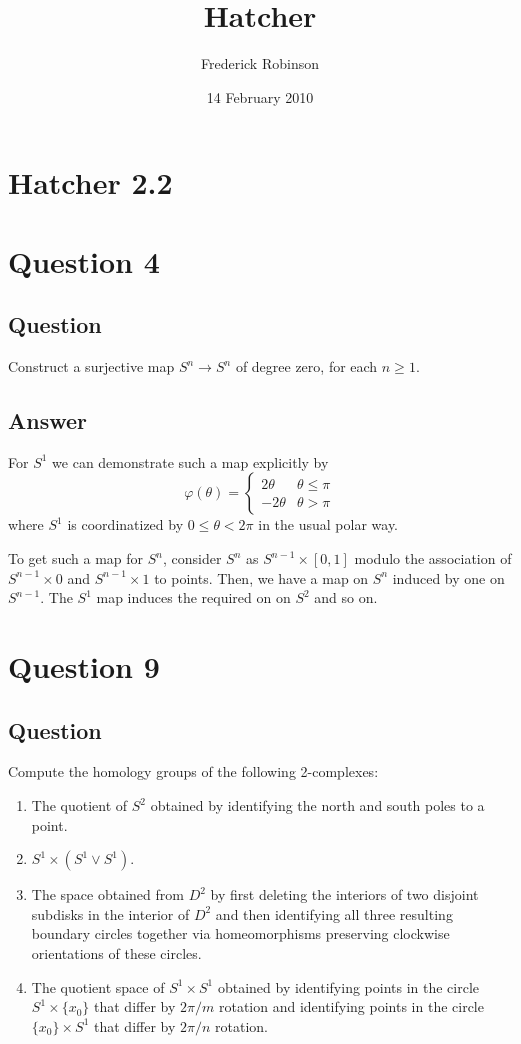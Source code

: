 \documentclass[11pt]{article}
\begin{document}



\title{Hatcher}
\author{Frederick Robinson}
\date{14 February 2010}
\maketitle


\section*{Hatcher 2.2}
\section{Question 4}
\subsection{Question}
Construct a surjective map $S^n \to S^n$ of degree zero, for each $n \geq 1$.
\subsection{Answer}
For $S^1$ we can demonstrate such a map explicitly by
\[\varphi(\theta) = \left\{ \begin{array}{ll} 2 \theta & \theta \leq \pi \\ -2 \theta & \theta > \pi \end{array} \right.\]
where $S^1$ is coordinatized by $0 \leq \theta< 2\pi$ in the usual polar way.

To get such a map for $S^n$, consider $S^n$ as $S^{n-1} \times [0,1]$ modulo the association of $S^{n-1} \times 0$ and $S^{n-1} \times 1$ to points. Then, we have a map on $S^n$ induced by one on $S^{n-1}$. The $S^1$ map induces the required on on $S^2$ and so on.



\section{Question 9}
\subsection{Question}
Compute the homology groups of the following 2-complexes:
\begin{enumerate}
\item The quotient of $S^2$ obtained by identifying the north and south poles to a point.
\item $S^1 \times (S^1 \vee S^1)$.
\item The space obtained from $D^2$ by first deleting the interiors of two disjoint subdisks in the interior of $D^2$ and then identifying all three resulting boundary circles together via homeomorphisms preserving clockwise orientations of these circles. 
\item The quotient space of $S^1 \times S^1$ obtained by identifying points in the circle $S^1 \times \{x_0\}$ that differ by $2 \pi / m $ rotation and identifying points in the circle $\{x_0\} \times S^1$ that differ by $2 \pi / n$ rotation.
\end{enumerate}
\end{document}
